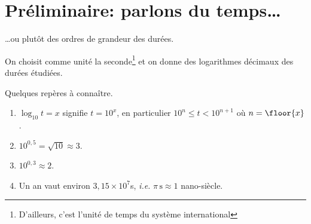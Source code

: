 \def\xxactivite{Cours}

\def\xxauteur{Emilien Durif -- Xavier Pessoles}
\fichefalse \proftrue \tdfalse \courstrue

\def\xxnumchapitre{Chapitre 7 \vspace{.2cm}}

\def\xxchapitre{Complexité algorithmique }

\def\xxcompetences{%
\textsl{%
\textbf{Savoirs et compétences :}\\
\begin{itemize}[label=\ding{112},font=\color{bleuxp}] 
\item Complexité.
\end{itemize}
}}

\def\xxfigures{
}%


\setlength{\columnseprule}{.1pt}

\vspace{2cm}
\pagestyle{fancy}
\thispagestyle{plain}
\section{Préliminaire: parlons du temps\ldots{}}

\ldots{}ou plutôt des ordres de grandeur des durées.

On choisit comme unité la seconde\footnote{D'ailleurs, c'est l'unité de temps du système international} et on donne des logarithmes décimaux des durées étudiées.

Quelques repères à connaître.
\begin{enumerate}
\item  $\log_{10} t = x$ signifie $t = 10^{x}$, en particulier
$10^{n}\leq t < 10^{n+1}$ où $n = \floor{x}$.
\item $10^{0,5} = \sqrt{10} \approx 3$.
\item $10^{0,3} \approx 2$.
\item Un an vaut environ $3,15\times 10^{7}$s, \emph{i.e.} $\pi \,\mathrm{s} \approx 1$ nano-siècle.
\end{enumerate}

